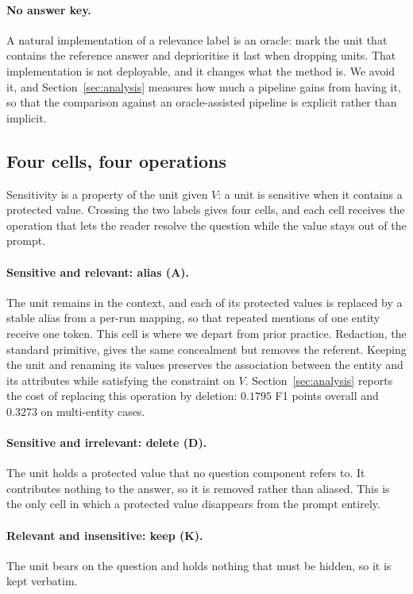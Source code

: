 \paragraph{No answer key.}
A natural implementation of a relevance label is an oracle: mark the unit that contains the
reference answer and deprioritise it last when dropping units. That implementation is not
deployable, and it changes what the method is. We avoid it, and
Section~\ref{sec:analysis} measures how much a pipeline gains from having it, so that the
comparison against an oracle-assisted pipeline is explicit rather than implicit.

\subsection{Four cells, four operations}

Sensitivity is a property of the unit given $V$: a unit is sensitive when it contains a
protected value. Crossing the two labels gives four cells, and each cell receives the
operation that lets the reader resolve the question while the value stays out of the prompt.

\paragraph{Sensitive and relevant: alias (\textbf{A}).}
The unit remains in the context, and each of its protected values is replaced by a stable
alias from a per-run mapping, so that repeated mentions of one entity receive one token.
This cell is where we depart from prior practice. Redaction, the standard primitive, gives
the same concealment but removes the referent. Keeping the unit and renaming its values
preserves the association between the entity and its attributes while satisfying the
constraint on $V$. Section~\ref{sec:analysis} reports the cost of replacing this operation by
deletion: $0.1795$ F1 points overall and $0.3273$ on multi-entity cases.

\paragraph{Sensitive and irrelevant: delete (\textbf{D}).}
The unit holds a protected value that no question component refers to. It contributes
nothing to the answer, so it is removed rather than aliased. This is the only cell in which a
protected value disappears from the prompt entirely.

\paragraph{Relevant and insensitive: keep (\textbf{K}).}
The unit bears on the question and holds nothing that must be hidden, so it is kept verbatim.

